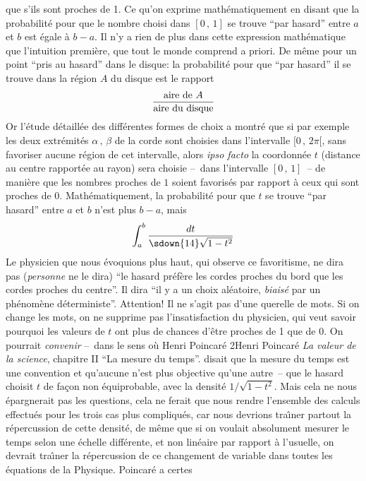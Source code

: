 que s'ils sont proches de 1. Ce qu'on exprime math\'ematiquement en 
disant que la probabilit\'e pour que le nombre choisi dans  $[ 0\, , \, 
1]$ se trouve ``par hasard'' entre $a$ et $b$ est \'egale \`a $b-a$. Il  
n'y a rien de plus dans cette expression math\'ematique que l'intuition 
premi\`ere, que tout le monde comprend a priori. De m\^eme pour un 
point ``pris au hasard'' dans le disque: la probabilit\'e pour que ``par 
hasard'' il se trouve dans la r\'egion $A$ du disque est le rapport  
$${\hbox{aire de $A$} \over\hbox{aire du disque} }$$ 
Or l'\'etude d\'etaill\'ee des diff\'erentes formes de choix a montr\'e  
que si par exemple les deux extr\'emit\'es $\alpha\, , \,\beta$ de la 
corde  sont choisies dans l'intervalle $[ 0\, , \, 2\pi [$, sans favoriser 
aucune r\'egion de cet intervalle, alors {\it ipso facto} la coordonn\'ee 
$t$ (distance au centre rapport\'ee au rayon) sera choisie --~dans 
l'intervalle $[ 0\, , \, 1]$~-- de mani\`ere que les nombres proches 
de $1$ soient favoris\'es par rapport \`a ceux qui sont proches de 0. 
Math\'ematiquement, la probabilit\'e pour que $t$ se trouve ``par 
hasard'' entre $a$ et $b$ n'est plus $b-a$, mais  
$$\int_a^b {dt \over \sdown{14}\sqrt{1-t^2}}$$ 
Le physicien que nous \'evoquions plus haut, qui observe ce 
favoritisme, ne dira pas ({\it personne} ne le dira) ``le hasard 
pr\'ef\`ere les cordes proches du bord que les cordes proches du  
centre''. Il dira ``il y a un choix al\'eatoire, {\it biais\'e} par un 
ph\'enom\`ene d\'eterministe''. 
\medskip 
Attention! Il ne s'agit pas d'une querelle de mots. Si on change les mots, 
on ne supprime pas l'insatisfaction du physicien, qui veut savoir 
pourquoi les valeurs de $t$ ont plus de chances d'\^etre proches de 1 que 
de 0. On pourrait {\it convenir} --~dans le sens o\`u Henri Poincar\'e\ftn 
{2}{Henri Poincar\'e {\it La valeur de la science}, chapitre II ``La mesure 
du temps''.} disait que la mesure du temps est une convention et 
qu'aucune n'est plus objective qu'une autre~-- que le hasard choisit $t$ 
de fa\c con non \'equiprobable, avec la densit\'e $1 \bigl/ \sqrt{1-t^2}$. 
Mais cela ne nous \'epargnerait pas les questions, cela ne ferait que nous 
rendre l'ensemble des calculs effectu\'es pour  les trois cas plus 
compliqu\'es, car nous devrions tra\^\i ner partout la r\'epercussion de 
cette densit\'e, de m\^eme que si on voulait absolument mesurer le 
temps selon une \'echelle diff\'erente, et  non lin\'eaire par rapport \`a 
l'usuelle, on devrait tra\^\i ner la r\'epercussion de ce changement de 
variable dans toutes les \'equations de la Physique. Poincar\'e a certes 
